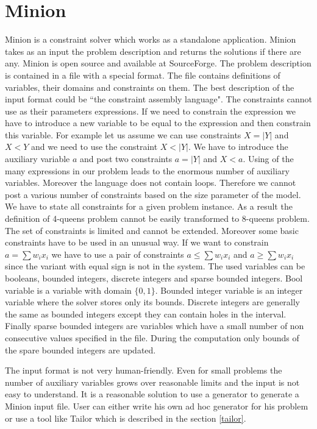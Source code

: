\section{Minion}

Minion is a constraint solver which works as a standalone application. Minion takes
as an input the problem description and returns the solutions if there are any.
Minion is open source and available at SourceForge. The problem description
is contained in a file with a special format. The file contains definitions of variables,
their domains and constraints on them. The best description of the input format could
be ``the constraint assembly language". The constraints cannot use as their parameters 
expressions. If we need to constrain the expression we have to introduce a new variable
to be equal to the expression and then constrain this variable. For example let us assume 
we can use constraints $X = |Y|$ and $X < Y$ and we need to use the constraint $X < |Y|$.
We have to introduce the auxiliary variable $a$ and post two constraints $a = |Y|$ and
 $X < a$. Using of the many expressions in our problem leads to the enormous number of
 auxiliary variables. Moreover the language does not contain loops. Therefore we
 cannot post a various number of constraints based on the size parameter of the model.
 We have to state all constraints for a given problem instance. As a result the definition
 of 4-queens problem cannot be easily transformed to 8-queens problem. The set of constraints
 is limited and cannot be extended. Moreover some basic constraints have to be used in an unusual way.
 If we want to constrain $a = \sum{w_i x_i}$ we have to use a pair of constraints
 $a \leq \sum{w_i x_i}$ and $a \geq \sum{w_i x_i}$ since the variant with equal sign
 is not in the system. The used variables can be booleans, bounded integers, discrete integers
 and sparse bounded integers. Bool variable is a variable with domain $\{0,1\}$.
 Bounded integer variable is an integer variable where the solver stores only its bounds.
 Discrete integers are generally the same as bounded integers except they can contain 
 holes in the interval. Finally sparse bounded integers are variables which have a small
 number of non consecutive values specified in the file. During the computation
 only bounds of the spare bounded integers are updated.  
 
The input format is not very human-friendly. Even for small problems the number of
auxiliary variables grows over reasonable limits and the input is not easy to understand.
It is a reasonable solution to use a generator to generate a Minion input file.
User can either write his own ad hoc generator for his problem or use a tool like
Tailor which is described in the section \ref{tailor}.

